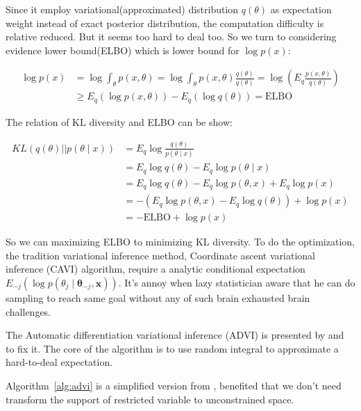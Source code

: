 \documentclass{article}
\begin{document}
Since it employ variational(approximated) distribution $q(\theta)$ as expectation weight 
instead of exact posterior distribution,
the computation difficulty is relative reduced. But it seems too hard to deal too. 
So we turn to considering evidence lower bound(ELBO) which is lower bound for $\log p(x)$:

\begin{align*}
\log p(x) &= \log \int_\theta p(x,\theta) = \log \int_\theta p(x,\theta) \frac{q(\theta)}{q(\theta)} = \log \left( E_q \frac{p(x,\theta)}{q(\theta)} \right)  \\
          &\ge E_q (\log p(x,\theta)) - E_q(\log q(\theta)) = \mathrm{ELBO}
\end{align*}

The relation of KL diversity and ELBO can be show:

\begin{align*}
KL(q(\theta) || p(\theta \mid x)) &= E_q \log \frac{q(\theta)}{p(\theta \mid x)}  \\
                                  &= E_q \log q(\theta) - E_q \log p(\theta \mid x) \\
                                  &= E_q \log q(\theta) - E_q \log p(\theta,x) + E_q \log p(x) \\
                                  &= -(E_q \log p(\theta,x) -E_q \log q(\theta)) + \log p(x) \\
                                  &= -\mathrm{ELBO} + \log p(x)
\end{align*}

So we can maximizing ELBO to minimizing KL diversity. 
To do the optimization, the tradition variational inference method, 
Coordinate ascent variational inference (CAVI) algorithm,
require a analytic conditional expectation $E_{-j}(\log p(\theta_j \mid \mathbf{\theta}_{-j},\mathbf{x}))$. 
It's annoy when lazy statistician aware that he can do sampling to
reach same goal without any of such brain exhausted brain challenges. 

The Automatic differentiation variational inference (ADVI) is presented by 
\cite{kucukelbir2017automatic} and \cite{kucukelbir2014fully} to fix it. 
The core of the algorithm is to use random integral to approximate a hard-to-deal expectation.

Algorithm~\ref{alg:advi} is a simplified version from \cite{kucukelbir2017automatic}, benefited that we don't need transform
the support of restricted variable to unconstrained space.
\end{document}
